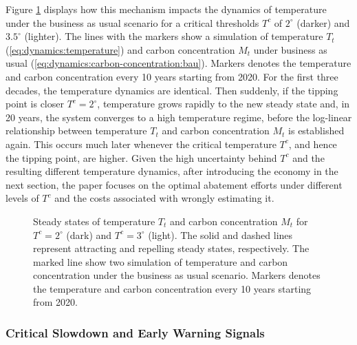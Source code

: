 \documentclass[../../main.tex]{subfiles}
\begin{document}
Figure \ref{fig:nullclines} displays how this mechanism impacts the dynamics of temperature under the business as usual scenario for a critical thresholds $T^c$ of  $2^\circ$ (darker) and $3.5^\circ$ (lighter). The lines with the markers show a simulation of temperature $T_t$ (\ref{eq:dynamics:temperature}) and carbon concentration $M_t$ under business as usual (\ref{eq:dynamics:carbon-concentration:bau}). Markers denotes the temperature and carbon concentration every 10 years starting from 2020. For the first three decades, the temperature dynamics are identical. Then suddenly, if the tipping point is closer $T^c = 2^\circ$, temperature grows rapidly to the new steady state and, in 20 years, the system converges to a high temperature regime, before the log-linear relationship between temperature $T_t$ and carbon concentration $M_t$ is established again. This occurs much later whenever the critical temperature $T^c$, and hence the tipping point, are higher. Given the high uncertainty behind $T^c$ and the resulting different temperature dynamics, after introducing the economy in the next section, the paper focuses on the optimal abatement efforts under different levels of $T^c$ and the costs associated with wrongly estimating it. \begin{figure}[H]
    \centering
    
    \caption{Steady states of temperature $T_t$ and carbon concentration $M_t$ for $T^c = 2^\circ$ (dark) and $T^c = 3^\circ$ (light). The solid and dashed lines represent attracting and repelling steady states, respectively. The marked line show two simulation of temperature and carbon concentration under the business as usual scenario. Markers denotes the temperature and carbon concentration every 10 years starting from 2020.}
    \label{fig:nullclines}
\end{figure}

\iffalse
\subsubsection{Critical Slowdown and Early Warning Signals}
\end{document}
